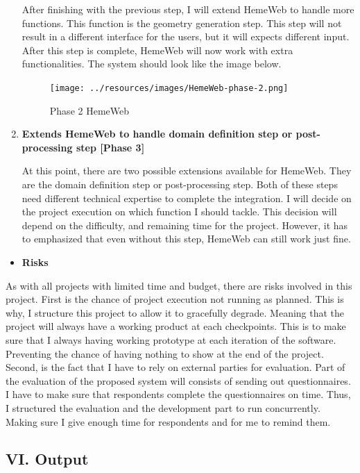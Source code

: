 \documentclass[]{article}
\providecommand{\tightlist}{%
  \setlength{\itemsep}{0pt}\setlength{\parskip}{0pt}}
\begin{document}
\begin{enumerate}
  After finishing with the previous step, I will extend HemeWeb to
  handle more functions. This function is the geometry generation step.
  This step will not result in a different interface for the users, but
  it will expects different input. After this step is complete, HemeWeb
  will now work with extra functionalities. The system should look like
  the image below.

  \begin{figure}[H]
  \centering
  \texttt{[image: ../resources/images/HemeWeb-phase-2.png]}
  \caption{Phase 2 HemeWeb}
  \end{figure}
\item
  \textbf{Extends HemeWeb to handle domain definition step or
  post-processing step {[}Phase 3{]}}

  At this point, there are two possible extensions available for
  HemeWeb. They are the domain definition step or post-processing step.
  Both of these steps need different technical expertise to complete the
  integration. I will decide on the project execution on which function
  I should tackle. This decision will depend on the difficulty, and
  remaining time for the project. However, it has to emphasized that
  even without this step, HemeWeb can still work just fine.
\end{enumerate}

\begin{itemize}
\tightlist
\item
  \textbf{Risks}
\end{itemize}

As with all projects with limited time and budget, there are risks
involved in this project. First is the chance of project execution not
running as planned. This is why, I structure this project to allow it to
gracefully degrade. Meaning that the project will always have a working
product at each checkpoints. This is to make sure that I always having
working prototype at each iteration of the software. Preventing the
chance of having nothing to show at the end of the project. Second, is
the fact that I have to rely on external parties for evaluation. Part of
the evaluation of the proposed system will consists of sending out
questionnaires. I have to make sure that respondents complete the
questionnaires on time. Thus, I structured the evaluation and the
development part to run concurrently. Making sure I give enough time for
respondents and for me to remind them.

\subsection{VI. Output}\label{vi.-output}
\end{document}
